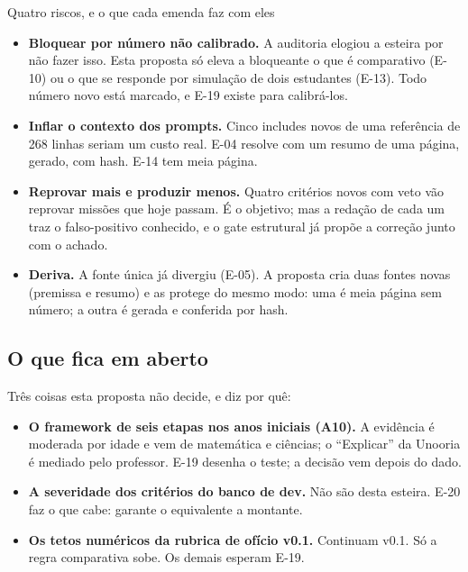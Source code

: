 \documentclass[11pt,a4paper]{article}
\begin{document}
\begin{notabox}{Quatro riscos, e o que cada emenda faz com eles}
\begin{itemize}
  \item \textbf{Bloquear por número não calibrado.} A auditoria elogiou a esteira por não fazer
        isso. Esta proposta só eleva a bloqueante o que é comparativo (E-10) ou o que se responde
        por simulação de dois estudantes (E-13). Todo número novo está marcado, e E-19 existe para
        calibrá-los.
  \item \textbf{Inflar o contexto dos prompts.} Cinco includes novos de uma referência de 268
        linhas seriam um custo real. E-04 resolve com um resumo de uma página, gerado, com hash.
        E-14 tem meia página.
  \item \textbf{Reprovar mais e produzir menos.} Quatro critérios novos com veto vão reprovar
        missões que hoje passam. É o objetivo; mas a redação de cada um traz o falso-positivo
        conhecido, e o gate estrutural já propõe a correção junto com o achado.
  \item \textbf{Deriva.} A fonte única já divergiu (E-05). A proposta cria duas fontes novas
        (premissa e resumo) e as protege do mesmo modo: uma é meia página sem número; a outra é
        gerada e conferida por hash.
\end{itemize}
\end{notabox}

\subsection{O que fica em aberto}

Três coisas esta proposta não decide, e diz por quê:

\begin{itemize}
  \item \textbf{O framework de seis etapas nos anos iniciais (A10).} A evidência é moderada por
        idade e vem de matemática e ciências; o ``Explicar'' da Unooria é mediado pelo professor.
        E-19 desenha o teste; a decisão vem depois do dado.
  \item \textbf{A severidade dos critérios do banco de dev.} Não são desta esteira. E-20 faz o que
        cabe: garante o equivalente a montante.
  \item \textbf{Os tetos numéricos da rubrica de ofício v0.1.} Continuam v0.1. Só a regra
        comparativa sobe. Os demais esperam E-19.
\end{itemize}
\end{document}

